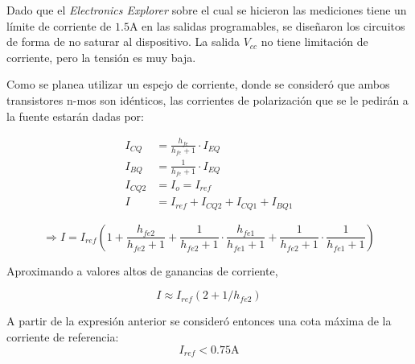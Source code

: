 Dado que el \textit{Electronics Explorer} sobre el cual se hicieron las mediciones tiene un límite de corriente de $1.5 \si{\ampere}$ en las salidas programables, se diseñaron los circuitos de forma de no saturar al dispositivo. La salida $V_{cc}$ no tiene limitación de corriente, pero la tensión es muy baja.

Como se planea utilizar un espejo de corriente, donde se consideró que ambos transistores n-mos son idénticos, las corrientes de polarización que se le pedirán a la fuente estarán dadas por:

\begin{align*}
    I_{CQ} &= \frac{h_{fe}}{h_{fe}+1} \cdot I_{EQ} \\
    I_{BQ} &= \frac{1}{h_{fe}+1} \cdot I_{EQ}\\
    I_{CQ2} &= I_o = I_{ref} \\
    I &= I_{ref} + I_{CQ2} + I_{CQ1} + I_{BQ1}
\end{align*}

\begin{equation}
    \Rightarrow I = I_{ref} \left(1 + \frac{h_{fe2}}{h_{fe2}+1} + \frac{1}{h_{fe2}+1}\cdot\frac{h_{fe1}}{h_{fe1}+1}+\frac{1}{h_{fe2}+1}\cdot\frac{1}{h_{fe1}+1}\right)
\end{equation}

Aproximando a valores altos de ganancias de corriente,

\begin{equation}
    I \approx I_{ref}\left(2+1/h_{fe2}\right)
\end{equation}

A partir de la expresión anterior se consideró entonces una cota máxima de la corriente de referencia:
\begin{equation}
    I_{ref} < 0.75 \si{\ampere}
    \label{eq:Iref}
\end{equation}